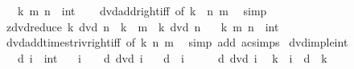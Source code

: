 \begin{isabellebody}
\ \ \ k\ m\ n\ {\isacharcolon}{\kern0pt}{\isacharcolon}{\kern0pt}\ int\isanewline
%
\isadelimproof
\ \ %
\endisadelimproof
%
\isatagproof
{}\isamarkupfalse%
\ dvd{\isacharunderscore}{\kern0pt}add{\isacharunderscore}{\kern0pt}right{\isacharunderscore}{\kern0pt}iff\ {\isacharbrackleft}{\kern0pt}of\ k\ {\isachardoublequoteopen}{\isacharminus}{\kern0pt}\ n{\isachardoublequoteclose}\ m{\isacharbrackright}{\kern0pt}\ \isamarkupfalse%
\ simp%
\endisatagproof
{\isafoldproof}%
%
\isadelimproof
\isanewline
%
\endisadelimproof
\isanewline
{}\isamarkupfalse%
\ zdvd{\isacharunderscore}{\kern0pt}reduce{\isacharcolon}{\kern0pt}\ {\isachardoublequoteopen}k\ dvd\ n\ {\isacharplus}{\kern0pt}\ k\ {\isacharasterisk}{\kern0pt}\ m\ {\isasymlongleftrightarrow}\ k\ dvd\ n{\isachardoublequoteclose}\isanewline
\ \ \ k\ m\ n\ {\isacharcolon}{\kern0pt}{\isacharcolon}{\kern0pt}\ int\isanewline
%
\isadelimproof
\ \ %
\endisadelimproof
%
\isatagproof
{}\isamarkupfalse%
\ dvd{\isacharunderscore}{\kern0pt}add{\isacharunderscore}{\kern0pt}times{\isacharunderscore}{\kern0pt}triv{\isacharunderscore}{\kern0pt}right{\isacharunderscore}{\kern0pt}iff\ {\isacharbrackleft}{\kern0pt}of\ k\ n\ m{\isacharbrackright}{\kern0pt}\ \isamarkupfalse%
\ {\isacharparenleft}{\kern0pt}simp\ add{\isacharcolon}{\kern0pt}\ ac{\isacharunderscore}{\kern0pt}simps{\isacharparenright}{\kern0pt}%
\endisatagproof
{\isafoldproof}%
%
\isadelimproof
\isanewline
%
\endisadelimproof
\isanewline
{}\isamarkupfalse%
\ dvd{\isacharunderscore}{\kern0pt}imp{\isacharunderscore}{\kern0pt}le{\isacharunderscore}{\kern0pt}int{\isacharcolon}{\kern0pt}\isanewline
\ \ \ d\ i\ {\isacharcolon}{\kern0pt}{\isacharcolon}{\kern0pt}\ int\isanewline
\ \ \ {\isachardoublequoteopen}i\ {\isasymnoteq}\ {}{\isachardoublequoteclose}\ \ {\isachardoublequoteopen}d\ dvd\ i{\isachardoublequoteclose}\isanewline
\ \ \ {\isachardoublequoteopen}{\isasymbar}d{\isasymbar}\ {\isasymle}\ {\isasymbar}i{\isasymbar}{\isachardoublequoteclose}\isanewline
%
\isadelimproof
%
\endisadelimproof
%
\isatagproof
{}\isamarkupfalse%
\ {\isacharminus}{\kern0pt}\isanewline
\ \ \isamarkupfalse%
\ {\isacartoucheopen}d\ dvd\ i{\isacartoucheclose}\ \isamarkupfalse%
\ k\ \ {\isachardoublequoteopen}i\ {\isacharequal}{\kern0pt}\ d\ {\isacharasterisk}{\kern0pt}\ k{\isachardoublequoteclose}\ \isacommand{{\isachardot}{\kern0pt}{\isachardot}{\kern0pt}}\isamarkupfalse%

\end{isabellebody}
